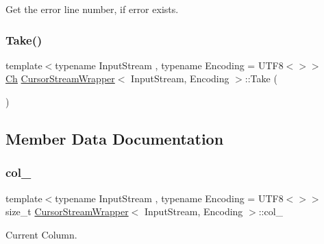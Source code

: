 Get the error line number, if error exists. 

\mbox{\label{classCursorStreamWrapper_af0bbad24ff7ad101cdf9842760deb0f6}} 
\subsubsection{\texorpdfstring{Take()}{Take()}}
{\footnotesize\ttfamily template$<$typename Input\+Stream , typename Encoding  = U\+T\+F8$<$$>$$>$ \\
\hyperlink{classCursorStreamWrapper_a4bab1186bfeebbcf00719c2613b0dca6}{Ch} \hyperlink{classCursorStreamWrapper}{Cursor\+Stream\+Wrapper}$<$ Input\+Stream, Encoding $>$\+::Take (\begin{DoxyParamCaption}{ }\end{DoxyParamCaption})\hspace{0.3cm}{\ttfamily [inline]}}



\subsection{Member Data Documentation}
\mbox{\label{classCursorStreamWrapper_ac487665a7485024745d82cd0cfa7107d}} 
\subsubsection{\texorpdfstring{col\+\_\+}{col\_}}
{\footnotesize\ttfamily template$<$typename Input\+Stream , typename Encoding  = U\+T\+F8$<$$>$$>$ \\
size\+\_\+t \hyperlink{classCursorStreamWrapper}{Cursor\+Stream\+Wrapper}$<$ Input\+Stream, Encoding $>$\+::col\+\_\+\hspace{0.3cm}{\ttfamily [private]}}



Current Column. 

\mbox{\label{classCursorStreamWrapper_a6f49c4b224ab4210223202696ed1b6b0}} 
